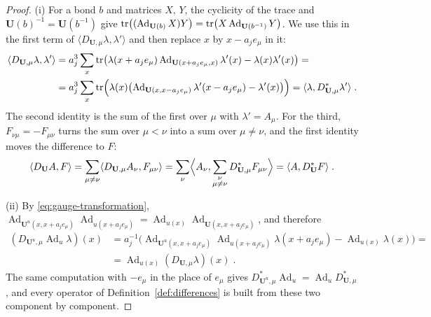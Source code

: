 \documentclass[11pt]{preprint}
\newcommand{\Ad}{\operatorname{Ad}}
\numberwithin{equation}{section}
\begin{document}
\begin{proof}
(i) For a bond $b$ and matrices $X$, $Y$, the cyclicity of the trace and $\mathbf U(b)^{-1} = \mathbf U(b^{-1})$ give $\tr\bigl((\Ad_{\mathbf U(b)}X)Y\bigr) = \tr\bigl(X\Ad_{\mathbf U(b^{-1})}Y\bigr)$. We use this in the first term of $\langle D_{\mathbf U,\mu}\lambda, \lambda'\rangle$ and then replace $x$ by $x - a_je_\mu$ in it:
\begin{align*}
    \langle D_{\mathbf U,\mu}\lambda, \lambda'\rangle
    &= a_j^3\sum_x\tr\bigl(\lambda(x + a_je_\mu)\Ad_{\mathbf U(x + a_je_\mu, x)}\lambda'(x) - \lambda(x)\lambda'(x)\bigr) = \\
    &= a_j^3\sum_x\tr\Bigl(\lambda(x)\bigl(\Ad_{\mathbf U(x, x - a_je_\mu)}\lambda'(x - a_je_\mu) - \lambda'(x)\bigr)\Bigr)
    = \langle\lambda, D^*_{\mathbf U,\mu}\lambda'\rangle\;.
\end{align*}
The second identity is the sum of the first over $\mu$ with $\lambda' = A_\mu$. For the third, $F_{\nu\mu} = -F_{\mu\nu}$ turns the sum over $\mu < \nu$ into a sum over $\mu \neq \nu$, and the first identity moves the difference to $F$:
\[
    \langle D_{\mathbf U}A, F\rangle
    = \sum_{\mu \neq \nu}\langle D_{\mathbf U,\mu}A_\nu, F_{\mu\nu}\rangle
    = \sum_\nu\Bigl\langle A_\nu, \sum_{\substack{\nu\\\mu \neq \nu}}D^*_{\mathbf U,\mu}F_{\mu\nu}\Bigr\rangle
    = \langle A, D^*_{\mathbf U}F\rangle\;.
\]

(ii) By \eqref{eq:gauge-transformation}, $\Ad_{\mathbf U^u(x, x + a_je_\mu)}\Ad_{u(x + a_je_\mu)} = \Ad_{u(x)}\Ad_{\mathbf U(x, x + a_je_\mu)}$, and therefore
\begin{align*}
    (D_{\mathbf U^u,\mu}\Ad_u\lambda)(x)
    &= a_j^{-1}\bigl(\Ad_{\mathbf U^u(x, x + a_je_\mu)}\Ad_{u(x + a_je_\mu)}\lambda(x + a_je_\mu) - \Ad_{u(x)}\lambda(x)\bigr) =\\
    &= \Ad_{u(x)}(D_{\mathbf U,\mu}\lambda)(x)\;.
\end{align*}
The same computation with $-e_\mu$ in the place of $e_\mu$ gives $D^*_{\mathbf U^u,\mu}\Ad_u = \Ad_uD^*_{\mathbf U,\mu}$, and every operator of Definition~\ref{def:differences} is built from these two component by component.


\end{proof}
\end{document}
